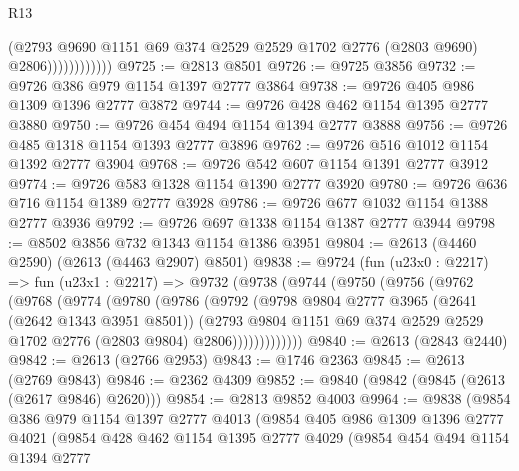 \begin{lexlean}{R13}
\begin{coremodule}
                          (@2793
                            @9690
                            @1151
                            @69
                            @374
                            @2529
                            @2529
                            @1702
                            @2776
                            (@2803 @9690)
                            @2806))))))))))))
@9725 := @2813 @8501
@9726 := @9725 @3856
@9732 := @9726 @386 @979 @1154 @1397 @2777 @3864
@9738 := @9726 @405 @986 @1309 @1396 @2777 @3872
@9744 := @9726 @428 @462 @1154 @1395 @2777 @3880
@9750 := @9726 @454 @494 @1154 @1394 @2777 @3888
@9756 := @9726 @485 @1318 @1154 @1393 @2777 @3896
@9762 := @9726 @516 @1012 @1154 @1392 @2777 @3904
@9768 := @9726 @542 @607 @1154 @1391 @2777 @3912
@9774 := @9726 @583 @1328 @1154 @1390 @2777 @3920
@9780 := @9726 @636 @716 @1154 @1389 @2777 @3928
@9786 := @9726 @677 @1032 @1154 @1388 @2777 @3936
@9792 := @9726 @697 @1338 @1154 @1387 @2777 @3944
@9798 := @8502 @3856 @732 @1343 @1154 @1386 @3951
@9804 := @2613 (@4460 @2590) (@2613 (@4463 @2907) @8501)
@9838 := @9724
    (fun (u23x0 : @2217) =>
    fun (u23x1 : @2217) =>
    @9732
      (@9738
        (@9744
          (@9750
            (@9756
              (@9762
                (@9768
                  (@9774
                    (@9780
                      (@9786
                        (@9792
                          (@9798
                            @9804
                            @2777
                            @3965
                            (@2641 (@2642 @1343 @3951 @8501))
                            (@2793
                              @9804
                              @1151
                              @69
                              @374
                              @2529
                              @2529
                              @1702
                              @2776
                              (@2803 @9804)
                              @2806)))))))))))))
@9840 := @2613 (@2843 @2440)
@9842 := @2613 (@2766 @2953)
@9843 := @1746 @2363
@9845 := @2613 (@2769 @9843)
@9846 := @2362 @4309
@9852 := @9840 (@9842 (@9845 (@2613 (@2617 @9846) @2620)))
@9854 := @2813 @9852 @4003
@9964 := @9838
    (@9854
      @386
      @979
      @1154
      @1397
      @2777
      @4013
      (@9854
        @405
        @986
        @1309
        @1396
        @2777
        @4021
        (@9854
          @428
          @462
          @1154
          @1395
          @2777
          @4029
          (@9854
            @454
            @494
            @1154
            @1394
            @2777

\end{coremodule}
\end{lexlean}
